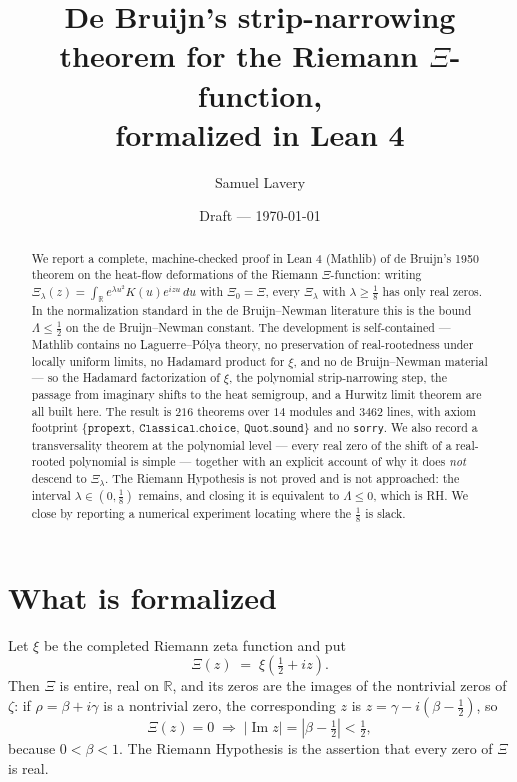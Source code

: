 \documentclass[11pt]{article}
\title{De Bruijn's strip-narrowing theorem for the Riemann \texorpdfstring{$\Xi$}{Xi}-function,\\
       formalized in Lean 4}
\author{Samuel Lavery}
\date{Draft --- \today}
\theoremstyle{definition}
\DeclareMathOperator{\Imop}{Im}
\begin{document}
\maketitle

\begin{abstract}
We report a complete, machine-checked proof in Lean 4 (Mathlib) of de Bruijn's 1950 theorem on the
heat-flow deformations of the Riemann $\Xi$-function: writing
$\Xi_\lambda(z)=\int_{\mathbb R} e^{\lambda u^{2}}K(u)e^{izu}\,du$ with $\Xi_0=\Xi$, every $\Xi_\lambda$
with $\lambda\ge\tfrac18$ has only real zeros.  In the normalization standard in the
de Bruijn--Newman literature this is the bound $\Lambda\le\tfrac12$ on the de Bruijn--Newman constant.
The development is self-contained --- Mathlib contains no Laguerre--P\'olya theory, no preservation of
real-rootedness under locally uniform limits, no Hadamard product for $\xi$, and no de Bruijn--Newman
material --- so the Hadamard factorization of $\xi$, the polynomial strip-narrowing step, the passage
from imaginary shifts to the heat semigroup, and a Hurwitz limit theorem are all built here.  The
result is $216$ theorems over $14$ modules and $3462$ lines, with axiom footprint
$\{\texttt{propext},\ \texttt{Classical.choice},\ \texttt{Quot.sound}\}$ and no \texttt{sorry}.
We also record a transversality theorem at the polynomial level --- every real zero of the shift of a
real-rooted polynomial is simple --- together with an explicit account of why it does \emph{not}
descend to $\Xi_\lambda$.
The Riemann Hypothesis is not proved and is not approached: the interval $\lambda\in(0,\tfrac18)$
remains, and closing it is equivalent to $\Lambda\le 0$, which is RH.  We close by reporting a
numerical experiment locating where the $\tfrac18$ is slack.
\end{abstract}

\section{What is formalized}

Let $\xi$ be the completed Riemann zeta function and put
\[
  \Xi(z)\;=\;\xi\!\left(\tfrac12+iz\right).
\]
Then $\Xi$ is entire, real on $\mathbb R$, and its zeros are the images of the nontrivial zeros of
$\zeta$: if $\rho=\beta+i\gamma$ is a nontrivial zero, the corresponding $z$ is
$z=\gamma-i(\beta-\tfrac12)$, so
\begin{equation}\label{eq:strip}
  \Xi(z)=0 \;\Longrightarrow\; |\Imop z|=\left|\beta-\tfrac12\right|<\tfrac12 ,
\end{equation}
because $0<\beta<1$.  The Riemann Hypothesis is the assertion that every zero of $\Xi$ is real.
\end{document}
